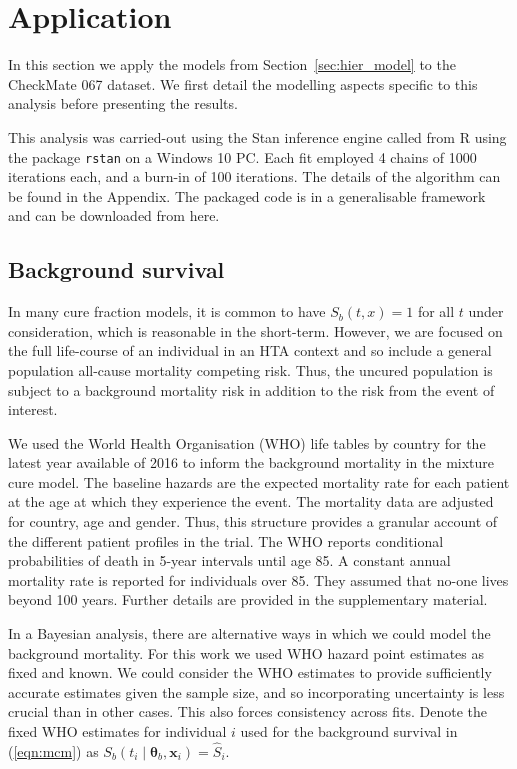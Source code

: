 \documentclass[AMA,STIX1COL]{WileyNJD-v2}
\begin{document}
%
\section{Application}\label{sec:application}
In this section we apply the models from Section~\ref{sec:hier_model} to the CheckMate 067 dataset.
We first detail the modelling aspects specific to this analysis before presenting the results.

This analysis was carried-out using the Stan inference engine \cite{carpenter2017stan} called from R \cite{Rcoreteam} using the package \texttt{rstan} on a Windows 10 PC.
Each fit employed 4 chains of 1000 iterations each, and a burn-in of 100 iterations.
The details of the algorithm can be found in the Appendix.
The packaged code is in a generalisable framework and can be downloaded from here.

%
\subsection{Background survival}
In many cure fraction models, it is common to have $S_b(t, x) = 1$ for all $t$ under consideration, which is reasonable in the short-term.
However, we are focused on the full life-course of an individual in an HTA context and so include a general population all-cause mortality competing risk.
Thus, the uncured population is subject to a background mortality risk in addition to the risk from the event of interest.

We used the World Health Organisation (WHO) life tables by country for the latest year available of 2016 \cite{wholifetables} to inform the background mortality in the mixture cure model.
The baseline hazards are the expected mortality rate for each patient at the age at which they experience the event.
The mortality data are adjusted for country, age and gender. Thus, this structure provides a granular account of the different patient profiles in the trial.
The WHO reports conditional probabilities of death in 5-year intervals until age 85.
A constant annual mortality rate is reported for individuals over 85. They assumed that no-one lives beyond 100 years.
Further details are provided in the supplementary material.

In a Bayesian analysis, there are alternative ways in which we could model the background mortality.
For this work we used WHO hazard point estimates as fixed and known.
We could consider the WHO estimates to provide sufficiently accurate estimates given the sample size, and so incorporating uncertainty is less crucial than in other cases. This also forces consistency across fits.
Denote the fixed WHO estimates for individual $i$ used for the background survival in (\ref{eqn:mcm}) as
$S_b(t_i \mid \bm\theta_b, \bm{x}_i) = \hat{S}_i$.
\end{document}
